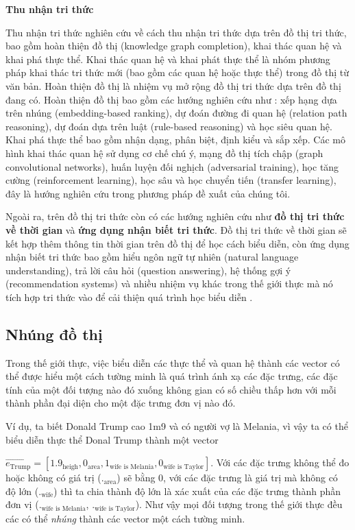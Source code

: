 \textbf{Thu nhận tri thức}

Thu nhận tri thức nghiên cứu về cách thu nhận tri thức dựa trên đồ thị tri thức, bao gồm hoàn thiện đồ thị (knowledge graph completion), khai thác quan hệ và khai phá thực thể. Khai thác quan hệ và khai phát thực thể là nhóm phương pháp khai thác tri thức mới (bao gồm các quan hệ hoặc thực thể) trong đồ thị từ văn bản. Hoàn thiện đồ thị là nhiệm vụ mở rộng đồ thị tri thức dựa trên đồ thị đang có. Hoàn thiện đồ thị bao gồm các hướng nghiên cứu như : xếp hạng dựa trên nhúng (embedding-based ranking), dự đoán đường đi quan hệ (relation path reasoning), dự đoán dựa trên luật (rule-based reasoning) và học siêu quan hệ.
Khai phá thực thể bao gồm nhận dạng, phân biệt, định kiểu và sắp xếp. 
Các mô hình khai thác quan hệ sử dụng cơ chế chú ý, mạng đồ thị tích chập (graph
convolutional networks), huấn luyện đối nghịch (adversarial training), học tăng cường (reinforcement learning), học sâu và học chuyển tiến (transfer learning), đây là hướng nghiên cứu trong phương pháp đề xuất của chúng tôi.

Ngoài ra, trên đồ thị tri thức còn có các hướng nghiên cứu như \textbf{đồ thị tri thức về thời gian} và \textbf{ứng dụng nhận biết tri thức}. Đồ thị tri thức về thời gian sẽ kết hợp thêm thông tin thời gian trên đồ thị để học cách biểu diễn, còn ứng dụng nhận biết tri thức bao gồm hiểu ngôn ngữ tự nhiên (natural language understanding), trả lời câu hỏi (question answering), hệ thống gợi ý (recommendation systems) và nhiều nhiệm vụ khác trong thế giới thực mà nó tích hợp tri thức vào để cải thiện quá trình học biểu diễn .

\subsection{Nhúng đồ thị}
\label{sec:graphEmbedding}

Trong thế giới thực, việc biểu diễn các thực thể và quan hệ thành các vector có thể được hiểu một cách tường minh là quá trình ánh xạ các đặc trưng, các đặc tính của một đối tượng nào đó xuống không gian có số chiều thấp hơn với mỗi thành phần đại diện cho một đặc trưng đơn vị nào đó. 

Ví dụ, ta biết Donald Trump cao 1m9 và có người vợ là Melania, vì vậy ta có thể biểu diễn thực thể Donal Trump thành một vector

$\overrightarrow{e_\text{Trump}} = [1.9_{\text{heigh}}, 0_{\text{area}}, 1_\text{wife is Melania}, 0_\text{wife is Taylor}]$. Với các đặc trưng không thể đo hoặc không có giá trị ($._{\text{area}}$) sẽ bằng 0, với các đặc trưng là giá trị mà không có độ lớn ($._{\text{wife}}$) thì ta chia thành độ lớn là xác xuất của các đặc trưng thành phần đơn vị ($._{\text{wife is Melania}}$, $._{\text{wife is Taylor}}$). Như vậy mọi đối tượng trong thế giới thực đều các có thể \textit{nhúng} thành các vector một cách tường minh.


